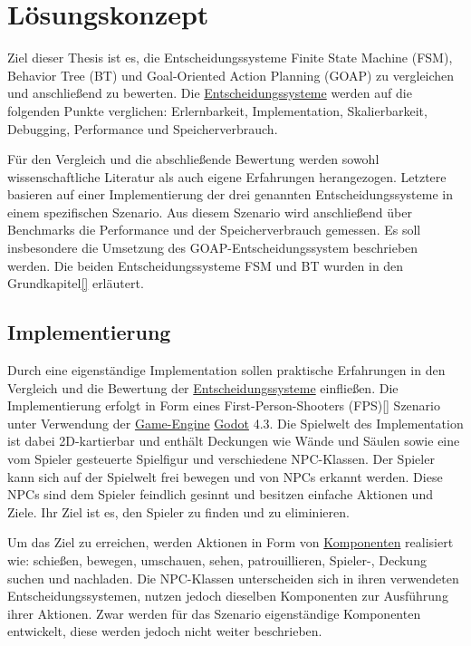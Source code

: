\chapter{L\"{o}sungskonzept}
\label{chap:l\"{o}sungskonzept}

Ziel dieser Thesis ist es, die Entscheidungssysteme Finite State Machine (FSM), Behavior Tree (BT) und Goal-Oriented Action Planning (GOAP) zu vergleichen und anschlie\ss{}end zu bewerten. Die \hyperref[chap:entscheidungssysteme]{Entscheidungssysteme} werden auf die folgenden Punkte verglichen: Erlernbarkeit, Implementation, Skalierbarkeit, Debugging, Performance und Speicherverbrauch.

F\"{u}r den Vergleich und die abschlie\ss{}ende Bewertung werden sowohl wissenschaftliche Literatur als auch eigene Erfahrungen herangezogen. Letztere basieren auf einer Implementierung der drei genannten Entscheidungssysteme in einem spezifischen Szenario. Aus diesem Szenario wird anschlie\ss{}end \"{u}ber Benchmarks die Performance und der Speicherverbrauch gemessen. Es soll insbesondere die Umsetzung des GOAP-Entscheidungssystem beschrieben werden. Die beiden Entscheidungssysteme FSM und BT wurden in den Grundkapitel\ref{} erl\"{a}utert.

\section{Implementierung}
\label{chap:lk implementierung}

Durch eine eigenst\"{a}ndige Implementation sollen praktische Erfahrungen in den Vergleich und die Bewertung der \hyperref[chap:entscheidungssysteme]{Entscheidungssysteme} einflie\ss{}en. Die Implementierung erfolgt in Form eines First-Person-Shooters (FPS)\ref{} Szenario unter Verwendung der \hyperref[chap:game engines]{Game-Engine} \hyperref[chap:godot]{Godot} 4.3. Die Spielwelt des Implementation ist dabei 2D-kartierbar und enth\"{a}lt Deckungen wie W\"{a}nde und S\"{a}ulen sowie eine vom Spieler gesteuerte Spielfigur und verschiedene NPC-Klassen. Der Spieler kann sich auf der Spielwelt frei bewegen und von NPCs erkannt werden. Diese NPCs sind dem Spieler feindlich gesinnt und besitzen einfache Aktionen und Ziele. Ihr Ziel ist es, den Spieler zu finden und zu eliminieren.

Um das Ziel zu erreichen, werden Aktionen in Form von \hyperref[chap:game-objects]{Komponenten} realisiert wie: schie\ss{}en, bewegen, umschauen, sehen, patrouillieren, Spieler-, Deckung suchen und nachladen. Die NPC-Klassen unterscheiden sich in ihren verwendeten Entscheidungssystemen, nutzen jedoch dieselben Komponenten zur Ausf\"{u}hrung ihrer Aktionen. Zwar werden f\"{u}r das Szenario eigenst\"{a}ndige Komponenten entwickelt, diese werden jedoch nicht weiter beschrieben.

